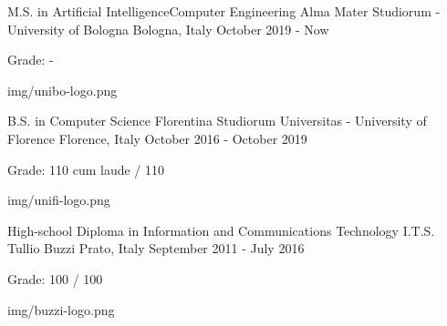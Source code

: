 
\begin{cventries}

  \logocventry
    {M.S. in Artificial Intelligence{\enskip\cdotp\enskip}Computer Engineering}
    {Alma Mater Studiorum - University of Bologna}
    {Bologna, Italy}
    {October 2019 - Now}
    {
      \begin{cvitems}
        \item {Grade: -}
      \end{cvitems}
    }
    {img/unibo-logo.png}

  \logocventry
    {B.S. in Computer Science}
    {Florentina Studiorum Universitas - University of Florence}
    {Florence, Italy}
    {October 2016 - October 2019}
    {
      \begin{cvitems}
        \item {Grade: 110 cum laude / 110}
      \end{cvitems}
    }
    {img/unifi-logo.png}

  \logocventry
    {High-school Diploma in Information and Communications Technology}
    {I.T.S. Tullio Buzzi}
    {Prato, Italy}
    {September 2011 - July 2016}
    {
      \begin{cvitems}
        \item {Grade: 100 / 100}
      \end{cvitems}
    }
    {img/buzzi-logo.png}

\end{cventries}
